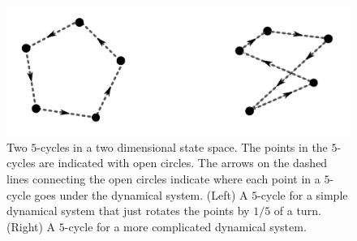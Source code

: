 \begin{figure}[h]
\centering
\includegraphics[scale=0.1]{./images/Two5-cycles.png}
\caption[Scott Hotton.]{Two $5$-cycles in a two dimensional state space. The 
points in the $5$-cycles are indicated with open circles. The arrows on the
dashed lines connecting the open circles indicate where each point in a 
$5$-cycle goes under the dynamical system.  (Left) A $5$-cycle for a simple 
dynamical system that just rotates the points by $1/5$ of a turn.  (Right) A 
$5$-cycle for a more complicated dynamical system.}
\label{F:Two5cycles}
\end{figure}

